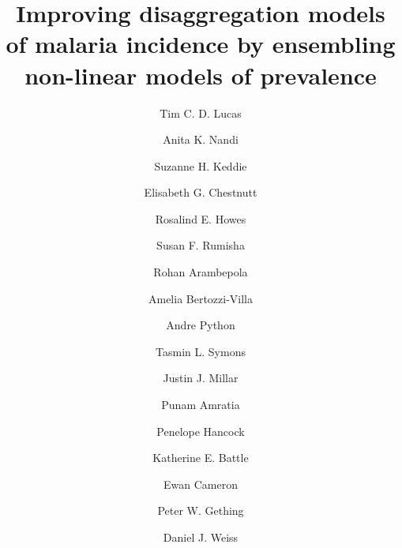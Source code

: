 \documentclass[review]{elsarticle}
\begin{document}









\begin{frontmatter}

\title{Improving disaggregation models of malaria incidence by ensembling non-linear models of prevalence}

\author[oxford]{Tim C. D. Lucas}
\author[oxford]{Anita K. Nandi}
\author[oxford]{Suzanne H. Keddie}
\author[oxford]{Elisabeth G. Chestnutt}
\author[oxford]{Rosalind E. Howes}
\author[oxford]{Susan F. Rumisha}
\author[oxford]{Rohan Arambepola}
\author[oxford,idm]{Amelia Bertozzi-Villa}
\author[oxford]{Andre Python}
\author[oxford]{Tasmin L. Symons}
\author[oxford]{Justin J. Millar}
\author[oxford]{Punam Amratia}
\author[oxford]{Penelope Hancock}
\author[oxford]{Katherine E. Battle}
\author[oxford]{Ewan Cameron}
\author[oxford,telethon,curtin]{Peter W. Gething}
\author[oxford]{Daniel J. Weiss}



\address[oxford]{Malaria Atlas Project, Big Data Institute, University of Oxford, Oxford, UK}
\address[idm]{Institute for Disease Modeling, Bellevue, WA, USA}
\address[telethon]{Telethon Kids Institute, Perth Children’s Hospital, Perth, Australia}
\address[curtin]{Curtin University, Perth, Australia}



\begin{abstract}


\end{abstract}
\end{frontmatter}
\end{document}
